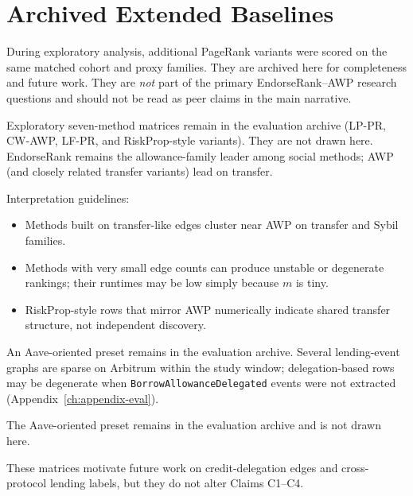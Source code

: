 \section{Archived Extended Baselines}
\label{ch:appendix-archive}

During exploratory analysis, additional PageRank variants were scored on the same matched cohort and proxy families. They are archived here for completeness and future work. They are \emph{not} part of the primary EndorseRank--AWP research questions and should not be read as peer claims in the main narrative.


Exploratory seven-method matrices remain in the evaluation archive (LP-PR, CW-AWP, LF-PR, and RiskProp-style variants). They are not drawn here. EndorseRank remains the allowance-family leader among social methods; AWP (and closely related transfer variants) lead on transfer.

Interpretation guidelines:

\begin{itemize}
\item Methods built on transfer-like edges cluster near AWP on transfer and Sybil families.
\item Methods with very small edge counts can produce unstable or degenerate rankings; their runtimes may be low simply because $m$ is tiny.
\item RiskProp-style rows that mirror AWP numerically indicate shared transfer structure, not independent discovery.
\end{itemize}


An Aave-oriented preset remains in the evaluation archive. Several lending-event graphs are sparse on Arbitrum within the study window; delegation-based rows may be degenerate when \texttt{BorrowAllowanceDelegated} events were not extracted (Appendix~\ref{ch:appendix-eval}).

The Aave-oriented preset remains in the evaluation archive and is not drawn here.

These matrices motivate future work on credit-delegation edges and cross-protocol lending labels, but they do not alter Claims C1--C4.


